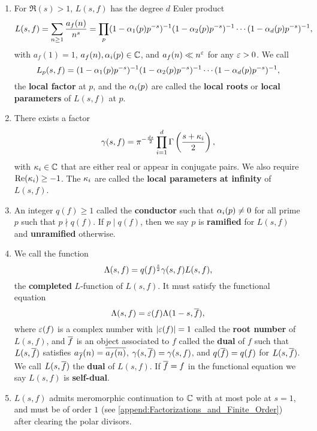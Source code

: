       \begin{enumerate}[label=(\roman*)]
        \item For $\Re(s) > 1$, $L(s,f)$ has the degree $d$ Euler product
        \[
          L(s,f) = \sum_{n \ge 1}\frac{a_{f}(n)}{n^{s}} = \prod_{p}(1-\alpha_{1}(p)p^{-s})^{-1}(1-\alpha_{2}(p)p^{-s})^{-1} \cdots (1-\alpha_{d}(p)p^{-s})^{-1},
        \]
        with $a_{f}(1) = 1$, $a_{f}(n),\alpha_{i}(p) \in \mathbb{C}$, and $a_{f}(n) \ll n^{\varepsilon}$ for any $\varepsilon > 0$. We call
        \[
          L_{p}(s,f) = (1-\alpha_{1}(p)p^{-s})^{-1}(1-\alpha_{2}(p)p^{-s})^{-1} \cdots (1-\alpha_{d}(p)p^{-s})^{-1},
        \]
        the \textbf{local factor} at $p$, and the $\alpha_{i}(p)$ are called the \textbf{local roots} or \textbf{local parameters} of $L(s,f)$ at $p$.
        \item There exists a factor
        \[
          \gamma(s,f) = \pi^{-\frac{ds}{2}}\prod_{i = 1}^{d}\Gamma\left(\frac{s+\kappa_{i}}{2}\right),
        \]
        with $\kappa_{i} \in \mathbb{C}$ that are either real or appear in conjugate pairs. We also require $\mathrm{Re}(\kappa_{i}) \ge -1$. The $\kappa_{i}$ are called the \textbf{local parameters at infinity} of $L(s,f)$.
        \item An integer $q(f) \ge 1$ called the \textbf{conductor} such that $\alpha_{i}(p) \neq 0$ for all prime $p$ such that $p \nmid q(f)$. If $p \mid q(f)$, then we say $p$ is \textbf{ramified} for $L(s,f)$ and \textbf{unramified} otherwise.
        \item We call the function
        \[
          \Lambda(s,f) = q(f)^{\frac{s}{2}}\gamma(s,f)L(s,f),
        \]
        the \textbf{completed} $L$-function of $L(s,f)$. It must satisfy the functional equation
        \[
          \Lambda(s,f) = \varepsilon(f)\Lambda(1-s,\overline{f}),
        \]
        where $\varepsilon(f)$ is a complex number with $|\varepsilon(f)| = 1$ called the \textbf{root number} of $L(s,f)$, and $\overline{f}$ is an object associated to $f$ called the \textbf{dual} of $f$ such that $L(s,\overline{f})$ satisfies $a_{\overline{f}}(n) = \overline{a_{f}(n)}$, $\gamma(s,\overline{f}) = \gamma(s,f)$, and $q(\overline{f}) = q(f)$ for $L(s,\overline{f})$. We call $L(s,\overline{f})$ the \textbf{dual} of $L(s,f)$. If $\overline{f} = f$ in the functional equation we say $L(s,f)$ is \textbf{self-dual}.
        \item $L(s,f)$ admits meromorphic continuation to $\mathbb{C}$ with at most pole at $s = 1$, and must be of order $1$ (see \cref{append:Factorizations_and_Finite_Order}) after clearing the polar divisors.
      \end{enumerate}
